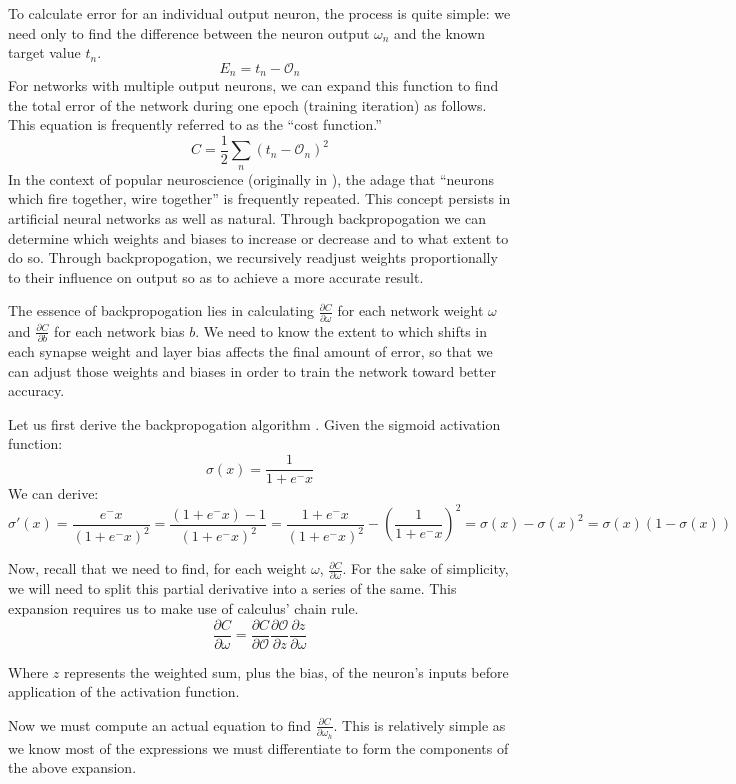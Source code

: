 \documentclass{article}
\begin{document}
To calculate error for an individual output neuron, the process is quite simple: we need only to find the difference between the neuron output $\omega_n$ and the known target value $t_n$.
$$E_n=t_n-\mathcal{O}_n$$
For networks with multiple output neurons, we can expand this function to find the total error of the network during one epoch (training iteration) as follows. This equation is frequently referred to as the ``cost function.'' \cite{mediummlbasics}
$$C=\frac{1}{2}\sum_n(t_n-\mathcal{O}_n)^2$$
In the context of popular neuroscience (originally in \cite{neuronsfire}), the adage that ``neurons which fire together, wire together'' is frequently repeated. This concept persists in artificial neural networks as well as natural. Through backpropogation we can determine which weights and biases to increase or decrease and to what extent to do so. Through backpropogation, we recursively readjust weights proportionally to their influence on output so as to achieve a more accurate result.

The essence of backpropogation lies in calculating $\frac{\partial{C}}{\partial{\omega}}$ for each network weight $\omega$ and $\frac{\partial{C}}{\partial{b}}$ for each network bias $b$. We need to know the extent to which shifts in each synapse weight and layer bias affects the final amount of error, so that we can adjust those weights and biases in order to train the network toward better accuracy.

Let us first derive the backpropogation algorithm \cite{derivebackprop}. Given the sigmoid activation function:
$$\sigma(x)=\frac{1}{1+e^-x}$$
We can derive:
$$\sigma'(x)=\frac{e^-x}{(1+e^-x)^2}=\frac{(1+e^-x)-1}{(1+e^-x)^2}=\frac{1+e^-x}{(1+e^-x)^2}-\left(\frac{1}{1+e^-x}\right)^2=\sigma(x)-\sigma(x)^2=\sigma(x)(1-\sigma(x))$$

Now, recall that we need to find, for each weight $\omega$, $\frac{\partial{C}}{\partial{\omega}}$. For the sake of simplicity, we will need to split this partial derivative into a series of the same. This expansion requires us to make use of calculus' chain rule.
$$\frac{\partial{C}}{\partial{\omega}}=\frac{ \partial{C} }{ \partial{\mathcal{O}} }
                                        \frac{ \partial{\mathcal{O}} }{ \partial{z} }
                                         \frac{ \partial{z} }{ \partial{\omega} }$$

Where $z$ represents the weighted sum, plus the bias, of the neuron's inputs before application of the activation function.

Now we must compute an actual equation to find $\frac{\partial{C}}{\partial{\omega_h}}$. This is relatively simple as we know most of the expressions we must differentiate to form the components of the above expansion.
\end{document}
